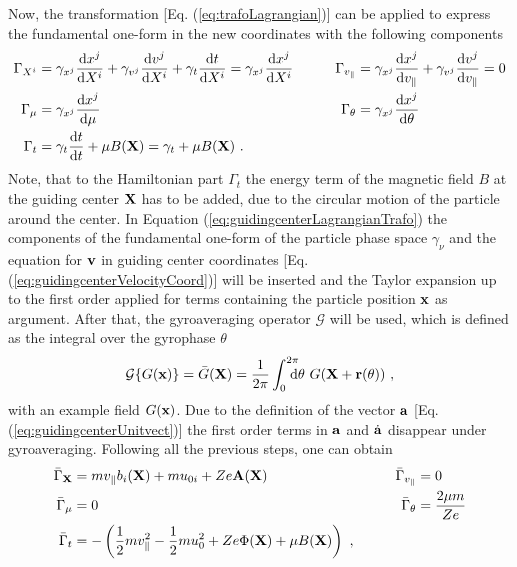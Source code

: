 Now, the transformation [Eq. (\ref{eq:trafoLagrangian})] can be applied to express the fundamental one-form in the new coordinates with the following components
\begin{gather}
    \begin{aligned}
        \Gamma_{X^i} &= \gamma_{x^j} \frac{\mathrm{d}x^j}{\mathrm{d}X^i} + \gamma_{v^j} \frac{\mathrm{d}v^j}{\mathrm{d}X^i} + \gamma_{t} \frac{\mathrm{d}t}{\mathrm{d}X^i} = \gamma_{x^j} \frac{\mathrm{d}x^j}{\mathrm{d}X^i} &\qquad \Gamma_{v_\parallel} &= \gamma_{x^j} \frac{\mathrm{d}x^j}{\mathrm{d}v_\parallel} + \gamma_{v^j} \frac{\mathrm{d}v^j}{\mathrm{d}v_\parallel} = 0 \\
        \Gamma_{\mu} &= \gamma_{x^j} \frac{\mathrm{d}x^j}{\mathrm{d}\mu}                                                                                                                                                      &\qquad \Gamma_{\theta}      &= \gamma_{x^j} \frac{\mathrm{d}x^j}{\mathrm{d}\theta}\\
        \Gamma_{t}   &= \gamma_{t} \frac{\mathrm{d}t}{\mathrm{d}t} + \mu B(\boldsymbol{\mathbf{X}}) = \gamma_t + \mu B(\boldsymbol{\mathbf{X}}) ~. & & \\
    \end{aligned}
    \label{eq:guidingcenterLagrangianTrafo}
\end{gather}
Note, that to the Hamiltonian part $\Gamma_t$ the energy term of the magnetic field $B$ at the guiding center $\boldsymbol{\mathbf{X}}$ has to be added, due to the circular motion of the particle around the center.
\newpage
In Equation (\ref{eq:guidingcenterLagrangianTrafo}) the components of the fundamental one-form of the particle phase space $\gamma_\nu$ and the equation for $\boldsymbol{\mathbf{v}}$ in guiding center coordinates [Eq. (\ref{eq:guidingcenterVelocityCoord})] will be inserted and the Taylor expansion up to the first order applied for terms containing the particle position $\boldsymbol{\mathbf{x}}$ as argument. After that, the gyroaveraging operator $\mathcal{G}$ will be used, which is defined as the integral over the gyrophase $\theta$
\begin{gather}
    \mathcal{G} \{G(\boldsymbol{\mathbf{x}})\} = \bar{G}(\boldsymbol{\mathbf{X}}) = \frac{1}{2\pi} \int_{0}^{2\pi} \!\!\!\!\! \mathrm{d}\theta ~ G(\boldsymbol{\mathbf{X}} + \boldsymbol{\mathbf{r}}(\theta))~,
    \label{eq:gyroOperator}
\end{gather}
with an example field $G(\boldsymbol{\mathbf{x}})$. Due to the definition of the vector $\boldsymbol{\mathbf{a}}$ [Eq. (\ref{eq:guidingcenterUnitvect})] the first order terms in $\boldsymbol{\mathbf{a}}$ and $\dot{\boldsymbol{\mathbf{a}}}$ disappear under gyroaveraging. Following all the previous steps, one can obtain
\begin{gather}
    \begin{aligned}
        \bar{\Gamma}_{\boldsymbol{\mathbf{X}}}  &= m v_\parallel b_i(\boldsymbol{\mathbf{X}}) + mu_{0i} + Ze\boldsymbol{\mathbf{A}}(\boldsymbol{\mathbf{X}})  &\qquad \bar{\Gamma}_{v_\parallel} &= 0 \\
        \bar{\Gamma}_{\mu} &= 0                                           &\qquad \bar{\Gamma}_{\theta}      &= \frac{2\mu m}{Ze}\\
        \bar{\Gamma}_{t}   &= - \left(\frac{1}{2}mv_\parallel^2 - \frac{1}{2}mu_0^2 + Ze\Phi(\boldsymbol{\mathbf{X}}) + \mu B(\boldsymbol{\mathbf{X}}) \right) ~, & & \\
    \end{aligned}
    \label{eq:guidingcenterLagrangianTrafoAverage}
\end{gather}
